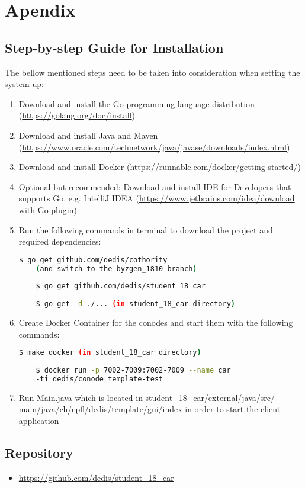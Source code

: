 \section{Apendix}

\subsection{Step-by-step Guide for Installation}
The bellow mentioned steps need to be taken into consideration when setting the system up:
\begin{enumerate}
    \item Download and install the Go programming language distribution
    (\url{https://golang.org/doc/install})
    \item Download and install Java and Maven
    (\url{https://www.oracle.com/technetwork/java/javase/downloads/index.html})
    \item Download and install Docker
    \newline
    (\url{https://runnable.com/docker/getting-started/})
    \item Optional but recommended:
    \newline
    Download and install IDE for Developers that supports Go, e.g. IntelliJ IDEA
    \newline
    (\url{https://www.jetbrains.com/idea/download} with Go plugin)
    \item Run the following commands in terminal to download the project and required dependencies:
    \begin{lstlisting}[language=bash]
    $ go get github.com/dedis/cothority 
    (and switch to the byzgen_1810 branch)
    
    $ go get github.com/dedis/student_18_car
    
    $ go get -d ./... (in student_18_car directory)
    \end{lstlisting}
    
    \item Create Docker Container for the conodes and start them with the following commands:
    \begin{lstlisting}[language=bash]
    $ make docker (in student_18_car directory)
    
    $ docker run -p 7002-7009:7002-7009 --name car
    -ti dedis/conode_template-test
    \end{lstlisting}
    
    \item Run Main.java which is located in student\_18\_car/external/java/src/
    \newline
    main/java/ch/epfl/dedis/template/gui/index in order to start the client application
\end{enumerate}
\subsection{Repository}
\begin{itemize}
    \item \url{https://github.com/dedis/student_18_car}
\end{itemize}

